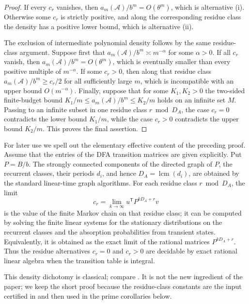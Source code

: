 \begin{proof}
  If every \(c_r\) vanishes, then
  \(a_m(\mathcal A)/b^m=O(\theta^m)\), which is alternative
  \textup{(i)}. Otherwise some \(c_r\) is strictly positive, and along
  the corresponding residue class the density has a positive lower
  bound, which is alternative \textup{(ii)}.

  The exclusion of intermediate polynomial density follows by the same
  residue-class argument. Suppose first that
  \(a_m(\mathcal A)/b^m\asymp m^{-\alpha}\) for some \(\alpha>0\).
  If all \(c_r\) vanish, then \(a_m(\mathcal A)/b^m=O(\theta^m)\), which
  is eventually smaller than every positive multiple of \(m^{-\alpha}\).
  If some \(c_r>0\), then along that residue class
  \(a_m(\mathcal A)/b^m\ge c_r/2\) for all sufficiently large \(m\),
  which is incompatible with an upper bound \(O(m^{-\alpha})\).
  Finally, suppose that for some \(K_1,K_2>0\) the two-sided
  finite-budget bound \(K_1/m\le a_m(\mathcal A)/b^m\le K_2/m\) holds
  on an infinite set \(M\). Passing to an infinite subset in one residue
  class \(r\bmod D_A\), the case \(c_r=0\) contradicts the lower bound
  \(K_1/m\), while the case \(c_r>0\) contradicts the upper bound
  \(K_2/m\). This proves the final assertion.
\end{proof}

For later use we spell out the elementary effective content of the
preceding proof. Assume that the entries of the DFA transition matrices
are given explicitly. Put \(P=B/b\). The strongly connected components
of the directed graph of \(P\), the recurrent classes, their periods
\(d_i\), and hence \(D_A=\operatorname{lcm}(d_i)\), are obtained by the
standard linear-time graph algorithms. For each residue class \(r\bmod
D_A\), the limit
\[
  c_r=\lim_{k\to\infty}u^{\mathsf T}P^{kD_A+r}v
\]
is the value of the finite Markov chain on that residue class; it can be
computed by solving the finite linear systems for the stationary
distributions on the recurrent classes and the absorption probabilities
from transient states. Equivalently, it is obtained as the exact
limit of the rational matrices \(P^{kD_A+r}\). Thus the residue
alternatives \(c_r=0\) and \(c_r>0\) are decidable by exact rational
linear algebra when the transition table is integral.

This density dichotomy is classical; compare
\cite{Berstel1973,BodirskyGaertnerVonOertzenSchwinghammer2004,Bell2020UpperDensity,Koga2019Density}.
It is not the new ingredient of the paper; we keep the short proof
because the residue-class constants are the input certified in
 and then used in the
prime corollaries below.


